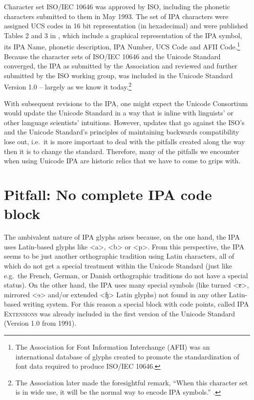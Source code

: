 Character set ISO/IEC 10646 was approved by ISO, including the phonetic 
characters submitted to them in May 1993. The set of IPA characters were 
assigned UCS codes in 16 bit representation (in hexadecimal) and were 
published Tables 2 and 3 in \cite{EslingGaylord1993}, which include a 
graphical representation of the IPA symbol, its IPA Name, phonetic description, 
IPA Number, UCS Code and AFII Code.\footnote{The Association for Font 
Information Interchange (AFII) was an international database of glyphs 
created to promote the standardization of font data required to produce 
ISO/IEC 10646.} Because the character sets of ISO/IEC 10646 and the 
Unicode Standard converged, the IPA as submitted by the Association 
and reviewed and further submitted by the ISO working group, was included 
in the Unicode Standard Version 1.0 -- largely as we know it today.\footnote{The 
Association later made the foresightful remark, ``When this character set 
is in wide use, it will be the normal way to encode IPA symbols.'' \citep[164]{IPA1999}.}

With subsequent revisions to the IPA, one might expect the Unicode 
Consortium would update the Unicode Standard in a way that is inline 
with linguists' or other language scientists' intuitions. However, 
updates that go against the ISO's and the Unicode Standard's principles 
of maintaining backwards compatibility lose out, i.e.\ it is more important 
to deal with the pitfalls created along the way then it is to change the 
standard. Therefore, many of the pitfalls we encounter when using Unicode 
IPA are historic relics that we have to come to grips with.


\section{Pitfall: No complete IPA code block}
\label{pitfall-no-complete-ipa-block}

The ambivalent nature of IPA glyphs arises because, on the one hand, the IPA
uses Latin-based glyphs like <a>, <b> or <p>. From this perspective, the IPA
seems to be just another orthographic tradition using Latin characters, all of
which do not get a special treatment within the Unicode Standard (just like
e.g.~the French, German, or Danish orthographic traditions do not have a special
status). On the other hand, the IPA uses many special symbols (like turned <ɐ>,
mirrored <ɘ> and/or extended <ɧ> Latin glyphs) not found in any other Latin-based
writing system. For this reason a special block with code points, called
\textsc{IPA Extensions} was already included in the first version of the Unicode
Standard (Version 1.0 from 1991).

